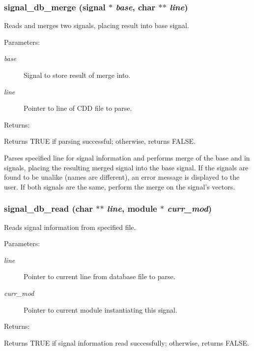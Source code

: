 \subsubsection{ signal\_\-db\_\-merge ({\bf signal} $\ast$ {\em base}, char $\ast$$\ast$ {\em line})}\label{signal_8h_a4}


Reads and merges two signals, placing result into base signal.

\begin{Desc}
\item[Parameters: ]\par
\begin{description}
\item[{\em 
base}]Signal to store result of merge into. \item[{\em 
line}]Pointer to line of CDD file to parse.\end{description}
\end{Desc}
\begin{Desc}
\item[Returns: ]\par
Returns TRUE if parsing successful; otherwise, returns FALSE.\end{Desc}
Parses specified line for signal information and performs merge  of the base and in signals, placing the resulting merged signal  into the base signal. If the signals are found to be unalike  (names are different), an error message is displayed to the user.  If both signals are the same, perform the merge on the signal's  vectors. 
\subsubsection{ signal\_\-db\_\-read (char $\ast$$\ast$ {\em line}, {\bf module} $\ast$ {\em curr\_\-mod})}\label{signal_8h_a3}


Reads signal information from specified file.

\begin{Desc}
\item[Parameters: ]\par
\begin{description}
\item[{\em 
line}]Pointer to current line from database file to parse. \item[{\em 
curr\_\-mod}]Pointer to current module instantiating this signal.\end{description}
\end{Desc}
\begin{Desc}
\item[Returns: ]\par
Returns TRUE if signal information read successfully; otherwise, returns FALSE.\end{Desc}


